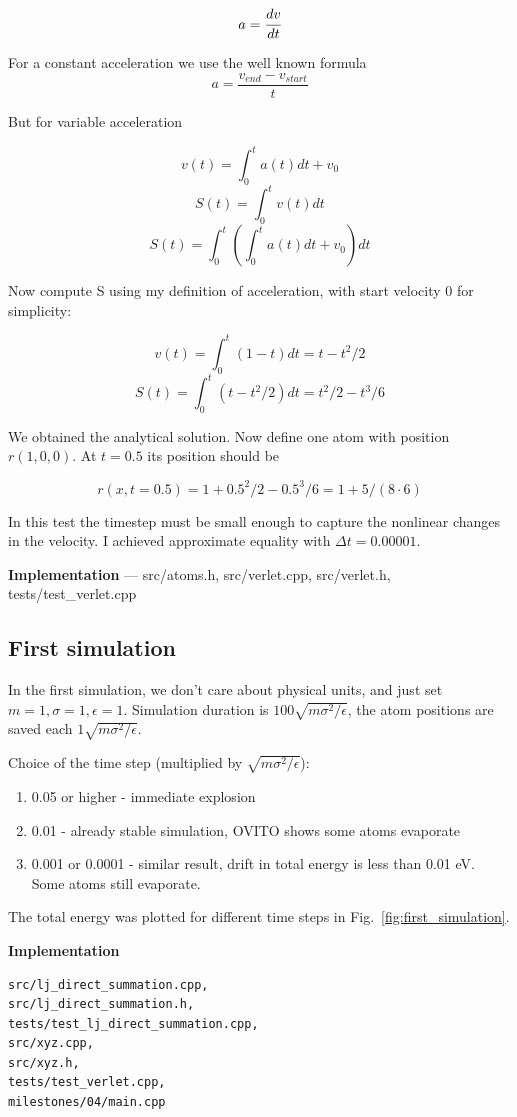 \documentclass[12pt,a4paper]{article}
\begin{document}
\[ a = \cfrac{dv}{dt} \]

For a constant acceleration we use the well known formula \[ a = \frac{v_{end}-v_{start}}{t} \]

But for variable acceleration

\[ v(t) = \int_0^t a(t) dt + v_0 \]
\[ S(t) = \int_0^t v(t) dt \]
\[ S(t) = \int_0^t \left( \int_0^t a(t) dt + v_0 \right) dt\]

Now compute S using my definition of acceleration, with start velocity 0 for simplicity:

\[ v(t) = \int_0^t (1-t) dt = t - t^2 / 2\]
\[ S(t) = \int_0^t (t - t^2/2) dt = t^2/2 - t^3/6 \]

We obtained the analytical solution. Now define one atom with position $r(1, 0, 0)$. At $t=0.5$ its position should be

\[ r(x, t=0.5) = 1 + 0.5^2/2 - 0.5^3/6 = 1 + 5/(8 \cdot 6)\]

In this test the timestep must be small enough to capture the nonlinear changes in the velocity. I achieved approximate equality with $\Delta t = 0.00001$.

{\bf Implementation} --- src/atoms.h, src/verlet.cpp, src/verlet.h, tests/test\_verlet.cpp

\subsection*{First simulation}
In the first simulation, we don't care about physical units, and just set \( m=1, \sigma=1, \epsilon=1 \). Simulation duration is \( 100 \sqrt{m\sigma^2 / \epsilon} \), the atom positions are saved each \( 1 \sqrt{m\sigma^2 / \epsilon} \).  

Choice of the time step (multiplied by \( \sqrt{m\sigma^2 / \epsilon} \)):

\begin{enumerate}
	\item 0.05 or higher - immediate explosion
	\item 0.01 - already stable simulation, OVITO shows some atoms evaporate
	\item 0.001 or 0.0001 - similar result, drift in total energy is less than 0.01 eV. Some atoms still evaporate.
\end{enumerate}

The total energy was plotted for different time steps in Fig.~\ref{fig:first_simulation}.

{\bf Implementation}
\begin{lstlisting}[breaklines]
src/lj_direct_summation.cpp, 
src/lj_direct_summation.h,
tests/test_lj_direct_summation.cpp,
src/xyz.cpp,
src/xyz.h,
tests/test_verlet.cpp,
milestones/04/main.cpp
\end{lstlisting}
\end{document}

